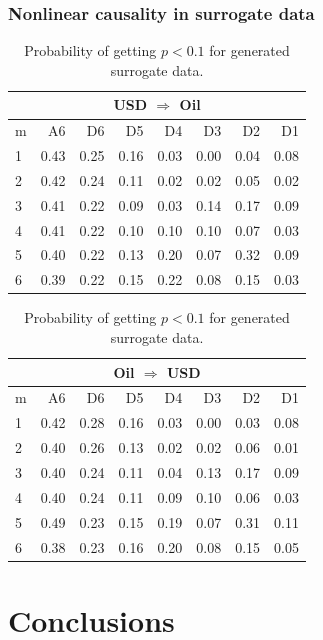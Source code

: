 \subsubsection{Nonlinear causality in surrogate data}

\begin{table}[H]
\begin{center}
\begin{tabular}{l|r r r r r r r}
\multicolumn{8}{c}{USD $\Rightarrow$ Oil}\\
\hline\hline
m & A6 & D6 & D5 & D4 & D3 & D2 & D1 \\
\hline
1 & 0.43 & 0.25 & 0.16 & 0.03 & 0.00 & 0.04 & 0.08 \\
2 & 0.42 & 0.24 & 0.11 & 0.02 & 0.02 & 0.05 & 0.02 \\
3 & 0.41 & 0.22 & 0.09 & 0.03 & 0.14 & 0.17 & 0.09 \\
4 & 0.41 & 0.22 & 0.10 & 0.10 & 0.10 & 0.07 & 0.03 \\
5 & 0.40 & 0.22 & 0.13 & 0.20 & 0.07 & 0.32 & 0.09 \\
6 & 0.39 & 0.22 & 0.15 & 0.22 & 0.08 & 0.15 & 0.03 \\
\hline\hline
\end{tabular}
\caption{Probability of getting $p < 0.1$ for generated surrogate data.}
\end{center}
\end{table}

\begin{table}[H]
\begin{center}
\begin{tabular}{l|r r r r r r r}
\multicolumn{8}{c}{Oil $\Rightarrow$ USD}\\
\hline\hline
m & A6 & D6 & D5 & D4 & D3 & D2 & D1 \\
\hline
1 & 0.42 & 0.28 & 0.16 & 0.03 & 0.00 & 0.03 & 0.08 \\
2 & 0.40 & 0.26 & 0.13 & 0.02 & 0.02 & 0.06 & 0.01 \\
3 & 0.40 & 0.24 & 0.11 & 0.04 & 0.13 & 0.17 & 0.09 \\
4 & 0.40 & 0.24 & 0.11 & 0.09 & 0.10 & 0.06 & 0.03 \\
5 & 0.49 & 0.23 & 0.15 & 0.19 & 0.07 & 0.31 & 0.11 \\
6 & 0.38 & 0.23 & 0.16 & 0.20 & 0.08 & 0.15 & 0.05 \\
\hline\hline
\end{tabular}
\caption{Probability of getting $p < 0.1$ for generated surrogate data.}
\end{center}
\end{table}

\section{Conclusions} \label{sec:conclusions}

